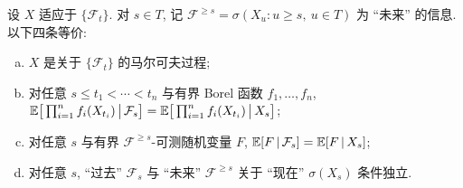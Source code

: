 \begin{theorem}[马尔可夫性的等价形式]\label{thm:markov-equivalent}
设 $X$ 适应于 $\{\mathcal{F}_t\}$. 对 $s\in T$, 记 $\mathcal{F}^{\ge s}=\sigma(X_u: u\ge s,\ u\in T)$ 为 ``未来'' 的信息. 以下四条等价:
\begin{enumerate}[(a)]
\item $X$ 是关于 $\{\mathcal{F}_t\}$ 的马尔可夫过程;
\item 对任意 $s\le t_1<\cdots<t_n$ 与有界 Borel 函数 $f_1,\dots,f_n$,
$\mathbb{E}\big[\prod_{i=1}^nf_i(X_{t_i})\,\big|\,\mathcal{F}_s\big]=\mathbb{E}\big[\prod_{i=1}^nf_i(X_{t_i})\,\big|\,X_s\big]$;
\item 对任意 $s$ 与有界 $\mathcal{F}^{\ge s}$-可测随机变量 $F$, $\mathbb{E}[F\,|\,\mathcal{F}_s]=\mathbb{E}[F\,|\,X_s]$;
\item 对任意 $s$, ``过去'' $\mathcal{F}_s$ 与 ``未来'' $\mathcal{F}^{\ge s}$ 关于 ``现在'' $\sigma(X_s)$ 条件独立.
\end{enumerate}
\end{theorem}

